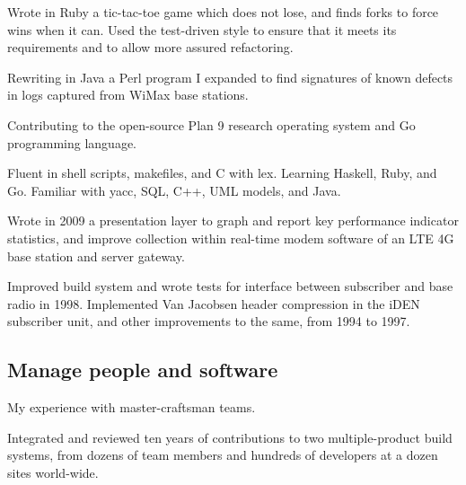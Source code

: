 \documentclass{tufte-handout}
\begin{document}
Wrote in Ruby a
tic-tac-toe game which does not lose, and finds forks to force wins when
it can.  Used the test-driven style to ensure that it meets its
requirements and to allow more assured refactoring.

Rewriting in Java a Perl program I expanded to find signatures of known
defects in logs captured from WiMax base stations.


Contributing
to the open-source Plan 9 research operating system and Go programming
language.

Fluent in shell scripts, makefiles, and C with lex.  Learning Haskell,
Ruby, and Go. Familiar with yacc, SQL, C++, UML models, and Java.

Wrote in 2009 a presentation layer to graph and report key performance
indicator statistics, and improve collection within real-time modem
software of an LTE 4G base station and server gateway.

Improved build system and wrote tests for interface between subscriber
and base radio in 1998.  Implemented Van Jacobsen header compression in
the iDEN subscriber unit, and other improvements to the same, from 1994
to 1997.


\pagebreak

\subsection{Manage people and software}

My
experience with master-craftsman teams.

Integrated and reviewed ten years of contributions to two
multiple-product build systems, from dozens of team members and hundreds
of developers at a dozen sites world-wide.
\end{document}

